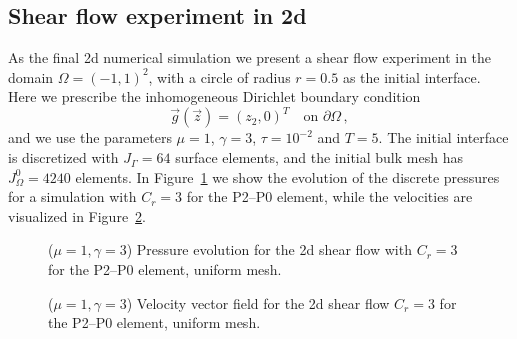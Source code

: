 \documentclass[a4paper,12pt,onecolumn]{article}
\begin{document}
\subsection{Shear flow experiment in 2d}
As the final 2d numerical simulation we present a shear flow experiment
in the domain $\Omega=(-1,1)^2$, with a circle of radius $r=0.5$ as the 
initial interface. Here we 
prescribe the inhomogeneous Dirichlet boundary condition
\begin{equation*}
\vec g(\vec z)=(z_2,0)^T\quad \mbox{on }\partial\Omega\,,
\end{equation*}
and we use the parameters $\mu=1$, $\gamma=3$, $\tau=10^{-2}$ and $T=5$. 
The initial interface is discretized with $J_\Gamma = 64$ surface elements, 
and the initial bulk mesh has $J_\Omega^0 = 4240$ elements.
In Figure~\ref{fig:shear_2d} we show the evolution of the discrete pressures
for a simulation with $C_r=3$ for the P2--P0 element, while the velocities
are visualized in Figure~\ref{fig:shear_2d_velocity}.
\begin{figure}[htbp]
  \centering
  \caption{($\mu=1,\gamma=3$) Pressure evolution for the 2d shear flow with $C_r=3$ for the P2--P0 element, uniform mesh.}
  \label{fig:shear_2d}
\end{figure}

\begin{figure}[htbp]
  \centering
  \caption{($\mu=1,\gamma=3$) Velocity vector field for the 2d shear flow 
$C_r=3$ for the P2--P0 element, uniform mesh.}
  \label{fig:shear_2d_velocity}
\end{figure}
\end{document}
